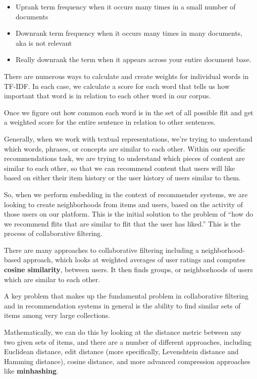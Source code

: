 \documentclass[11pt, table]{diazessay} %
\begin{document}
\begin{sloppypar}
\begin{itemize}
  \item Uprank term frequency when it occurs many times in a small number of documents
  \item Downrank term frequency when it occurs many times in many documents, aka is not relevant
  \item Really downrank the term when it appears across your entire document base\citep{schutze2008introduction}. 
\end{itemize}

There are numerous ways to calculate and create weights for individual words in TF-IDF. In each case, we calculate a score for each word that tells us how important that word is in relation to each other word in our corpus. 

Once we figure out how common each word is in the set of all possible flit and get a weighted score for the entire sentence in relation to other sentences.

Generally, when we work with textual representations, we’re trying to understand which words, phrases, or concepts are similar to each other. Within our specific recommendations task, we are trying to understand which pieces of content are similar to each other, so that we can recommend content that users will like based on either their item history or the user history of users similar to them. 

So, when we perform embedding in the context of recommender systems, we are looking to create neighborhoods from items and users, based on the activity of those users on our platform.  This is the initial solution to the problem of “how do we recommend flits that are similar to flit that the user has liked.” This is the process of collaborative filtering. 

There are many approaches to collaborative filtering including a neighborhood-based approach,  which looks at weighted averages of user ratings and computes \textbf{cosine similarity}, between users.  It then finds groups, or neighborhoods of users which are similar to each other. 

A key problem that makes up the fundamental problem in collaborative filtering and in recommendation systems in general is the ability to find similar sets of items among very large collections\citep{leskovec2020mining}. 

Mathematically, we can do this by looking at the distance metric between any two given sets of items, and there are a number of different approaches, including  Euclidean distance, edit distance (more specifically, Levenshtein distance and Hamming distance), cosine distance, and more advanced compression approaches like \textbf{minhashing}.


\end{sloppypar}
\end{document}
